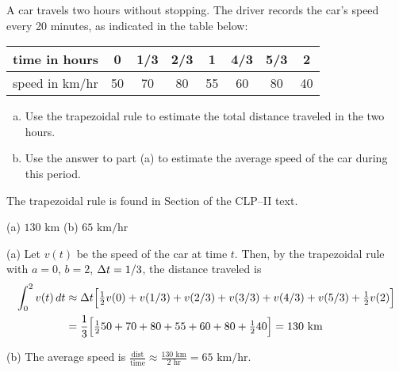\begin{Mquestion}[1997A]
A car travels two hours without stopping. The driver records
the car's speed every 20 minutes, as indicated in the table below:

\renewcommand{\arraystretch}{1.1}
\begin{center}
     \begin{tabular}{|l|c|c|c|c|c|c|c|}
          \hline
          time in hours&0&1/3&2/3&1&4/3&5/3&2  \\
          \hline
          speed in km/hr&50&70&80&55&60&80&40 \\
          \hline
     \end{tabular}
\end{center}
\renewcommand{\arraystretch}{1.0}

\begin{enumerate}[(a)]
\item
 Use the trapezoidal rule to estimate the total distance traveled in the two hours.
\item
 Use the answer to part (a)  to estimate the average speed of
the car during this period.
\end{enumerate}
\end{Mquestion}
\begin{hint}
The trapezoidal rule is found in  Section   of the
CLP--II text.
\end{hint}

\begin{answer}
(a) $130\text{ km}$
\qquad (b)
$65\text{ km/hr}$

\end{answer}

\begin{solution} (a)
 Let $v(t)$ be the speed of the car at time $t$. Then,
by the trapezoidal rule with $a=0$, $b=2$, $\Delta t=1/3$, the distance traveled
is
\begin{align*}
\int_0^2 v(t)\,dt
&\approx\Delta t\Big[\tfrac{1}{2} v(0)+v(1/3)+v(2/3)+v(3/3)
                      +v(4/3)+v(5/3)+\tfrac{1}{2} v(2)\Big]\\
&=\frac{1}{3}\Big[\tfrac{1}{2} 50+70+80+55+60+80+\tfrac{1}{2} 40\Big]
=130\text{ km}
\end{align*}

\noindent (b)
The average speed is $\frac{\text{dist}}{\text{time}} \approx \frac{130\text{ km}}{2\text{ hr}} =  65\text{ km/hr}$.
\end{solution}

